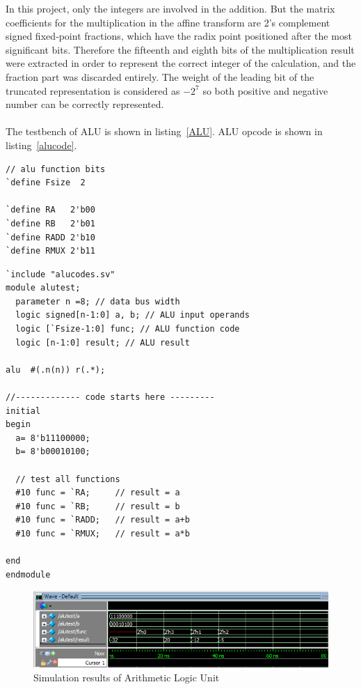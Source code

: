 In this project, only the integers are involved in the addition. But the matrix coefficients for the multiplication in the affine transform are 2’s complement signed fixed‐point fractions, which have the radix point positioned after the most significant bits. Therefore the fifteenth and eighth bits of the multiplication result were extracted in order to represent the correct integer of the calculation, and the fraction part was discarded entirely.  The weight of the leading bit of the truncated representation is considered as \(-2^7\) so both positive and negative number can be correctly represented.\\\\
The testbench of ALU is shown in listing~\ref{ALU}. ALU opcode is shown in listing~\ref{alucode}.

\begin{lstlisting}
// alu function bits
`define Fsize  2

`define RA   2'b00
`define RB   2'b01
`define RADD 2'b10
`define RMUX 2'b11
\end{lstlisting}

\begin{lstlisting}
`include "alucodes.sv"  
module alutest;
  parameter n =8; // data bus width
  logic signed[n-1:0] a, b; // ALU input operands
  logic [`Fsize-1:0] func; // ALU function code
  logic [n-1:0] result; // ALU result

alu  #(.n(n)) r(.*);

//------------- code starts here ---------
initial
begin
  a= 8'b11100000;
  b= 8'b00010100;
		
  // test all functions
  #10 func = `RA;     // result = a
  #10 func = `RB;     // result = b
  #10 func = `RADD;   // result = a+b 
  #10 func = `RMUX;   // result = a*b
	
end
endmodule 
\end{lstlisting}

\begin{figure}[H]
		\centering
		\includegraphics[width = \textwidth]{Figures/ALU}		
		\caption{Simulation results of Arithmetic Logic Unit}
		\label {fig:ALUtest}
\end{figure}

